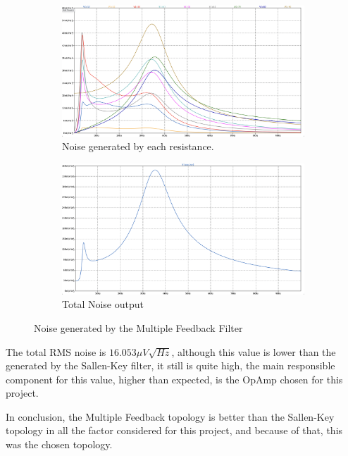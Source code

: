 \begin{figure}[H]
    \centering
    \begin{subfigure}{0.45\textwidth}
        \includegraphics*[width=\textwidth]{Images/NoiseResMFB.png}
        \caption{Noise generated by each resistance.}
        \label{fig:NoiseResMFB}  
    \end{subfigure}
    \begin{subfigure}{0.45\textwidth}
        \includegraphics*[width=\textwidth]{Images/NoiseTotalMFB.png}
        \caption{Total Noise output}
        \label{fig:NoiseTotalMFB}    
    \end{subfigure}
    \caption{Noise generated by the Multiple Feedback Filter}
    \label{fig:NoiseMFB}
\end{figure}

The total RMS noise is $16.053\mu V\sqrt{Hz}$, although this value is lower than the generated by the Sallen-Key filter, it still is quite high, the main responsible component for this value, higher than expected, is the OpAmp chosen for this project.

In conclusion, the Multiple Feedback topology is better than the Sallen-Key topology in all the factor considered for this project, and because of that, this was the chosen topology.